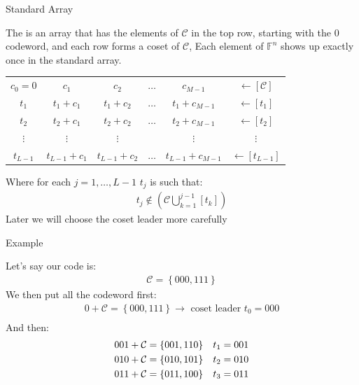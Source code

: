 \begin{parag}{Standard Array}
    \begin{definition}
    The  is an array that has the elements of $\mathcal{C}$ in the top row, starting with the $0$ codeword, and each row forms a coset of $\mathcal{C}$, Each element of $\mathbb{F}^n$ shows up exactly once in the standard array.
    \end{definition}
    \begin{center}
    \begin{tabular}{|ccccc|c}
	    $c_0 = 0$ & $c_1$ & $c_2$ & $\ldots$ & $c_{M-1}$ & $\leftarrow \left[\mathcal{C}\right]$  \\
	    $t_1$ & $t_1 + c_1$ & $t_1 + c_2$ & $\ldots$ & $t_1 +c_{M-1}$ & $\leftarrow \left[t_1\right]$ \\
	    $t_2$ & $t_2 + c_1$ & $t_2 + c_2$ & $\ldots$ & $t_2 + c_{M-1}$ & $\leftarrow \left[t_2\right]$ \\
	    $\vdots$ & $\vdots$ & $\vdots$ &  & $\vdots$ & $\vdots$ \\
	    $t_{L-1}$ & $t_{L-1} + c_1$ & $t_{L-1} + c_2$ & $\ldots$ & $t_{L-1} + c_{M-1}$ & $\leftarrow \left[t_{L-1}\right]$
    \end{tabular}
    \end{center}
    
    Where for each $j =  1, \ldots, L - 1$ $t_j$ is such that:
    \begin{align*} t_j \notin \left(\mathcal{C} \bigcup_{k = 1}^{j-1}[t_k]\right) \end{align*}
    Later we will choose the coset leader more carefully
    \begin{subparag}{Example}
        \begin{framedremark}
              Let's say our code  is:
              \begin{align*} 
                  \mathcal{C} =  \left\{000, 111\right\}
              \end{align*}
              We then put all the codeword first:
              \begin{align*} 
                  0 + \mathcal{C} =  \left\{000, 111\right\} \to \text{ coset leader } t_0 = 000\\
              \end{align*}
              And then:
              \begin{align*} 001 + \mathcal{C} = \left\{001, 110\right\} \mathspace t_1= 001\\
                010 + \mathcal{C} =  \left\{010, 101\right\} \mathspace t_2 = 010\\
                011 + \mathcal{C} =  \left\{011, 100\right\} \mathspace t_3 = 011
              \end{align*}
        \end{framedremark}
    \end{subparag}
\end{parag}
